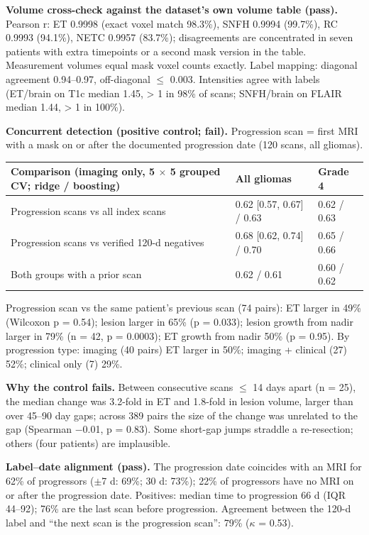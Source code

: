\documentclass[11pt,a4paper]{article}
\begin{document}
\textbf{Volume cross-check against the dataset's own volume table (pass).} Pearson r: ET 0.9998 (exact voxel
match 98.3\%), SNFH 0.9994 (99.7\%), RC 0.9993 (94.1\%), NETC 0.9957 (83.7\%); disagreements are concentrated
in seven patients with extra timepoints or a second mask version in the table. Measurement volumes equal mask
voxel counts exactly. Label mapping: diagonal agreement 0.94--0.97, off-diagonal $\leq$ 0.003. Intensities
agree with labels (ET/brain on T1c median 1.45, > 1 in 98\% of scans; SNFH/brain on FLAIR median 1.44, > 1 in
100\%).

\textbf{Concurrent detection (positive control; fail).} Progression scan = first MRI with a mask on or after
the documented progression date (120 scans, all gliomas).

\begin{table}[H]
\centering
\small
\begin{tabularx}{\linewidth}{@{}L R{4.30cm} R{2.02cm}@{}}
\toprule
Comparison (imaging only, 5 $\times$ 5 grouped CV; ridge / boosting) & All gliomas & Grade 4 \\
\midrule
Progression scans vs all index scans & 0.62 [0.57, 0.67] / 0.63 & 0.62 / 0.63 \\
Progression scans vs verified 120-d negatives & 0.68 [0.62, 0.74] / 0.70 & 0.65 / 0.66 \\
Both groups with a prior scan & 0.62 / 0.61 & 0.60 / 0.62 \\
\bottomrule
\end{tabularx}
\end{table}

Progression scan vs the same patient's previous scan (74 pairs): ET larger in 49\% (Wilcoxon p = 0.54); lesion
larger in 65\% (p = 0.033); lesion growth from nadir larger in 79\% (n = 42, p = 0.0003); ET growth from nadir
50\% (p = 0.95). By progression type: imaging (40 pairs) ET larger in 50\%; imaging + clinical (27) 52\%;
clinical only (7) 29\%.

\textbf{Why the control fails.} Between consecutive scans $\leq$ 14 days apart (n = 25), the median change was
3.2-fold in ET and 1.8-fold in lesion volume, larger than over 45--90 day gaps; across 389 pairs the size of
the change was unrelated to the gap (Spearman $-$0.01, p = 0.83). Some short-gap jumps straddle a
re-resection; others (four patients) are implausible.

\textbf{Label--date alignment (pass).} The progression date coincides with an MRI for 62\% of progressors
($\pm$7 d: 69\%; 30 d: 73\%); 22\% of progressors have no MRI on or after the progression date. Positives:
median time to progression 66 d (IQR 44--92); 76\% are the last scan before progression. Agreement between the
120-d label and ``the next scan is the progression scan'': 79\% ($\kappa$ = 0.53).
\end{document}
